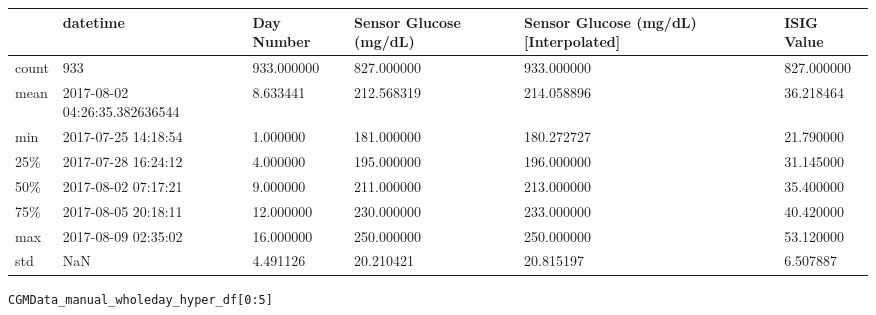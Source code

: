 \bigskip\noindent
\begin{tabular}{p{}p{}p{}p{}p{}p{}}
\toprule
 & datetime & Day Number & Sensor Glucose (mg/dL) & Sensor Glucose (mg/dL) [Interpolated] & ISIG Value \\
\hline
count & 933 & 933.000000 & 827.000000 & 933.000000 & 827.000000 \\
\hline
mean & 2017-08-02 04:26:35.382636544 & 8.633441 & 212.568319 & 214.058896 & 36.218464 \\
\hline
min & 2017-07-25 14:18:54 & 1.000000 & 181.000000 & 180.272727 & 21.790000 \\
\hline
25\% & 2017-07-28 16:24:12 & 4.000000 & 195.000000 & 196.000000 & 31.145000 \\
\hline
50\% & 2017-08-02 07:17:21 & 9.000000 & 211.000000 & 213.000000 & 35.400000 \\
\hline
75\% & 2017-08-05 20:18:11 & 12.000000 & 230.000000 & 233.000000 & 40.420000 \\
\hline
max & 2017-08-09 02:35:02 & 16.000000 & 250.000000 & 250.000000 & 53.120000 \\
\hline
std & NaN & 4.491126 & 20.210421 & 20.815197 & 6.507887 \\
\hline
\bottomrule
\end{tabular}

\bigskip

\begin{verbatim}
CGMData_manual_wholeday_hyper_df[0:5]
\end{verbatim}

